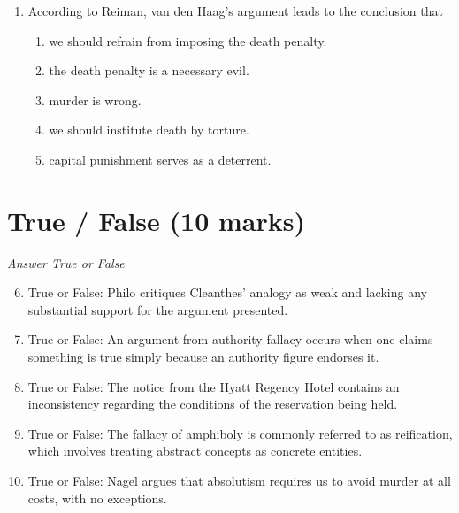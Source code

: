 \documentclass[12pt]{article}
\begin{document}
\begin{enumerate}[label=\arabic*.]
\begin{enumerate}[label=(\alph*)]
    \item ill-prepare them for the workforce.
    \item harm their ability to learn.
    \item all of the above.
\end{enumerate}
\item According to Reiman, van den Haag's argument leads to the conclusion that
\begin{enumerate}[label=(\alph*)]
    \item we should refrain from imposing the death penalty.
    \item the death penalty is a necessary evil.
    \item murder is wrong.
    \item we should institute death by torture.
    \item capital punishment serves as a deterrent.
\end{enumerate}
\end{enumerate}

\section*{True / False (10 marks)}
\textit{Answer True or False}
\begin{enumerate}[label=\arabic*.]
\setcounter{enumi}{5}
\item True or False: Philo critiques Cleanthes' analogy as weak and lacking any substantial support for the argument presented.
\item True or False: An argument from authority fallacy occurs when one claims something is true simply because an authority figure endorses it.
\item True or False: The notice from the Hyatt Regency Hotel contains an inconsistency regarding the conditions of the reservation being held.
\item True or False: The fallacy of amphiboly is commonly referred to as reification, which involves treating abstract concepts as concrete entities.
\item True or False: Nagel argues that absolutism requires us to avoid murder at all costs, with no exceptions.
\end{enumerate}
\end{document}
